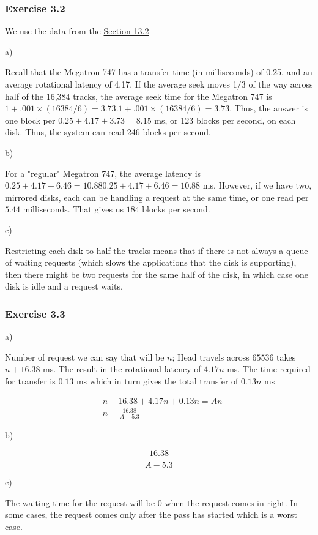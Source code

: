 \documentclass[../../main.tex]{subfiles}
\begin{document}
\subsubsection*{Exercise 3.2}

We use the data from the \hyperlink{Section13.2}{Section 13.2}

a)

Recall that the Megatron 747 has a transfer time (in milliseconds) of 0.25,
and an average rotational latency of 4.17. If the average seek
moves 1/3 of the way across half of the 16,384 tracks, the average seek time for the
Megatron 747 is $1 + .001 \times (16384/6) = 3.73.1+.001 \times (16384/6)=3.73.$
Thus, the answer is one block per $0.25 + 4.17 + 3.73 = 8.15$ ms, or 123 blocks per second,
on each disk. Thus, the system can read 246 blocks per second.

b)

For a "regular" Megatron 747, the average latency is $0.25 + 4.17 + 6.46 = 10.880.25+4.17+6.46=10.88$ ms.
However, if we have two, mirrored disks, each can be handling a request at the same time, or
one read per $5.44$ milliseconds. That gives us $184$ blocks per second.

c)

Restricting each disk to half the tracks means that
if there is not always a queue of waiting requests (which slows the applications
that the disk is supporting), then there might be two requests
for the same half of the disk, in which case one disk is idle and a request waits.

\subsubsection*{Exercise 3.3}

a)

Number of request we can say that will be $n$; Head travels across $65536$
takes $n+16.38$ ms. The result in the rotational latency of $4.17n$ ms.
The time required for transfer is $0.13$ ms which in turn gives the total
transfer of $0.13n$ ms

\begin{align*}
&n + 16.38 + 4.17n + 0.13n = An \\
&n = \frac{16.38}{A - 5.3}
\end{align*}

b)

$$
\frac{16.38}{A - 5.3}
$$

c)

The waiting time for the request will be 0 when the request comes in right.
In some cases, the request comes only after the pass has started
which is a worst case.
\end{document}
